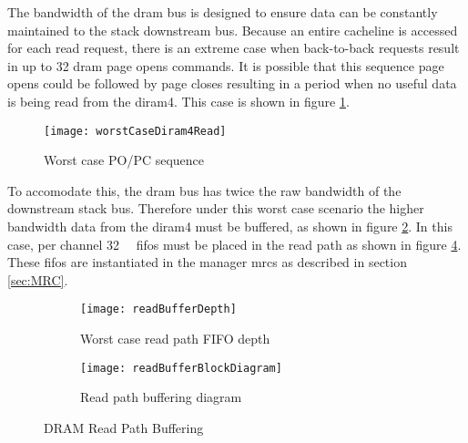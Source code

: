 The bandwidth of the \ac{dram} bus is designed to ensure data can be constantly maintained to the stack downstream bus.
Because an entire cacheline is accessed for each read request, there is an extreme case when back-to-back requests result in up to 32 \ac{dram} page opens commands.
It is possible that this sequence page opens could be followed by page closes resulting in a period when no useful data is being read from the \ac{diram4}.
This case is shown in figure \ref{fig:Worst case PO/PC sequence}.
\begin{figure}[!t]
\centering
\captionsetup{justification=centering}
\captionsetup{width=.9\linewidth}
\centerline{
\mbox{\texttt{[image: worstCaseDiram4Read]}}
}
\caption{Worst case PO/PC sequence}
\label{fig:Worst case PO/PC sequence}
\end{figure}
To accomodate this, the \ac{dram} bus has twice the raw bandwidth of the downstream stack bus. 
Therefore under this worst case scenario the higher bandwidth data from the \ac{diram4} must be buffered, as shown in figure \ref{fig:Worst case read path FIFO depth}.
In this case, per channel \SI[per-mode=symbol]{32}{\kilo\bit} \acp{fifo} must be placed in the read path as shown in figure \ref{fig:DRAM Read Path Buffering}.
These \acp{fifo} are instantiated in the manager \acp{mrc} as described in section \ref{sec:MRC}.


\begin{figure}
\centering
\begin{subfigure}{.9\textwidth}
  \centering
  \texttt{[image: readBufferDepth]}
  \captionsetup{justification=centering, skip=0pt}
  \caption{Worst case read path FIFO depth}
  \label{fig:Worst case read path FIFO depth}
\end{subfigure}%

\bigskip

\vspace{-10pt}
\begin{subfigure}{.9\textwidth}
  \centering
  \texttt{[image: readBufferBlockDiagram]}
  \captionsetup{justification=centering, skip=6pt}
  \caption{Read path buffering diagram}
  \label{fig:Read path buffering diagram}
\end{subfigure}
\captionsetup{justification=centering, skip=16pt}
\caption{DRAM Read Path Buffering}
\label{fig:DRAM Read Path Buffering}
\end{figure}

\iffalse 
Each of the \ac{diram4} memories contain two channels with each channel containing 32 banks and each bank contains 4096 \SI[per-mode=symbol]{4}{\kilo\bit} pages.
\fi

